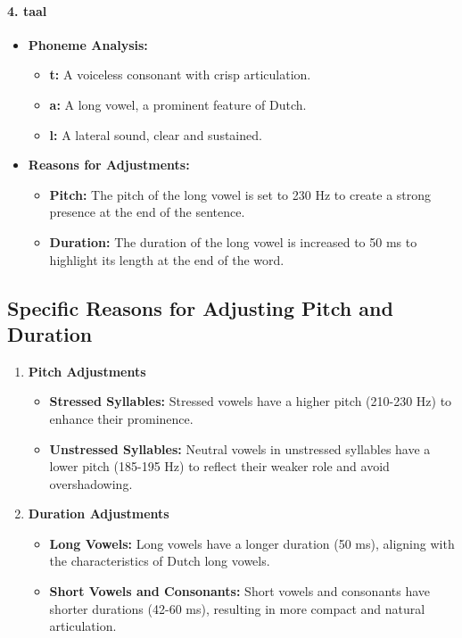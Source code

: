 \documentclass{../labbook}
\begin{document}
\begin{solution}
\paragraph{4. taal}
\begin{itemize}
    \item \textbf{Phoneme Analysis:}
        \begin{itemize}
            \item \textbf{t:} A voiceless consonant with crisp articulation.
            \item \textbf{a:} A long vowel, a prominent feature of Dutch.
            \item \textbf{l:} A lateral sound, clear and sustained.
        \end{itemize}
    \item \textbf{Reasons for Adjustments:}
        \begin{itemize}
            \item \textbf{Pitch:} The pitch of the long vowel is set to 230 Hz to create a strong presence at the end of the sentence.
            \item \textbf{Duration:} The duration of the long vowel is increased to 50 ms to highlight its length at the end of the word.
        \end{itemize}
\end{itemize}

\subsection*{Specific Reasons for Adjusting Pitch and Duration}
\begin{enumerate}
    \item \textbf{Pitch Adjustments}
        \begin{itemize}
            \item \textbf{Stressed Syllables:} Stressed vowels have a higher pitch (210-230 Hz) to enhance their prominence.
            \item \textbf{Unstressed Syllables:} Neutral vowels in unstressed syllables have a lower pitch (185-195 Hz) to reflect their weaker role and avoid overshadowing.
        \end{itemize}
    \item \textbf{Duration Adjustments}
        \begin{itemize}
            \item \textbf{Long Vowels:} Long vowels have a longer duration (50 ms), aligning with the characteristics of Dutch long vowels.
            \item \textbf{Short Vowels and Consonants:} Short vowels and consonants have shorter durations (42-60 ms), resulting in more compact and natural articulation.
        \end{itemize}
\end{enumerate}

\end{solution}
\end{document}
